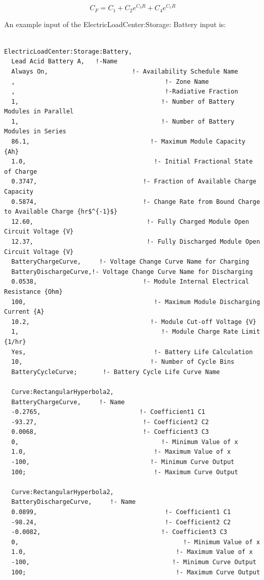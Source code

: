 \begin{equation}
{C_F} = {C_1} + {C_2}{e^{{C_3}R}} + {C_4}{e^{{C_5}R}}
\end{equation}

An example input of the ElectricLoadCenter:Storage: Battery input is:

\begin{lstlisting}

ElectricLoadCenter:Storage:Battery,
  Lead Acid Battery A,   !-Name
  Always On,                       !- Availability Schedule Name
  ,                                         !- Zone Name
  ,                                         !-Radiative Fraction
  1,                                       !- Number of Battery Modules in Parallel
  1,                                       !- Number of Battery Modules in Series
  86.1,                                 !- Maximum Module Capacity {Ah}
  1.0,                                   !- Initial Fractional State of Charge
  0.3747,                             !- Fraction of Available Charge Capacity
  0.5874,                             !- Change Rate from Bound Charge to Available Charge {hr$^{-1}$}
  12.60,                               !- Fully Charged Module Open Circuit Voltage {V}
  12.37,                               !- Fully Discharged Module Open Circuit Voltage {V}
  BatteryChargeCurve,     !- Voltage Change Curve Name for Charging
  BatteryDischargeCurve,!- Voltage Change Curve Name for Discharging
  0.0538,                             !- Module Internal Electrical Resistance {Ohm}
  100,                                   !- Maximum Module Discharging Current {A}
  10.2,                                 !- Module Cut-off Voltage {V}
  1,                                       !- Module Charge Rate Limit {1/hr}
  Yes,                                   !- Battery Life Calculation
  10,                                   !- Number of Cycle Bins
  BatteryCycleCurve;       !- Battery Cycle Life Curve Name

  Curve:RectangularHyperbola2,
  BatteryChargeCurve,     !- Name
  -0.2765,                           !- Coefficient1 C1
  -93.27,                             !- Coefficient2 C2
  0.0068,                             !- Coefficient3 C3
  0,                                       !- Minimum Value of x
  1.0,                                   !- Maximum Value of x
  -100,                                 !- Minimum Curve Output
  100;                                   !- Maximum Curve Output

  Curve:RectangularHyperbola2,
  BatteryDischargeCurve,     !- Name
  0.0899,                                   !- Coefficient1 C1
  -98.24,                                   !- Coefficient2 C2
  -0.0082,                                 !- Coefficient3 C3
  0,                                             !- Minimum Value of x
  1.0,                                         !- Maximum Value of x
  -100,                                       !- Minimum Curve Output
  100;                                         !- Maximum Curve Output


\end{lstlisting}
